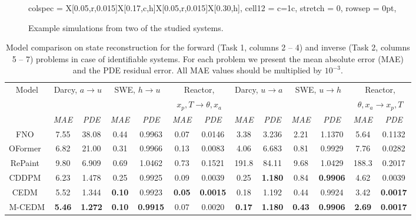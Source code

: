 \documentclass{article}
\newcommand{\xa}{x_a}
\newcommand{\xp}{x_p}
\begin{document}
\begin{figure}[t]
\begin{tblr}{
  colspec = {X[0.05,r,0.015]X[0.17,c,h]X[0.05,r,0.015]X[0.30,h]},
  cell{1}{2} = {c=1}{c}, %
  stretch = 0,
  rowsep = 0pt,
}
\end{tblr}
\vskip -2mm
\caption{Example simulations from two of the studied systems.
}
\label{f:systems}
\end{figure}



\begin{table}[t]
\caption{
Model comparison on state reconstruction for the forward (Task 1, columns 2 -- 4) and inverse (Task 2, columns 5 -- 7) problems in case of identifiable systems. For each problem we present the mean absolute error (MAE) and the PDE residual error. All MAE values should be multiplied by $10^{-3}$.
}
\label{tab:res_state1}
\begin{center}
\begin{tabular}{@{}c|cc|cc|cc||cc|cc|cc}
\multirow{3}{*}{Model}   & \multicolumn{2}{c|}{\multirow{2}{*}{Darcy, $a \rightarrow u$}} & \multicolumn{2}{c|}{\multirow{2}{*}{SWE, $h \rightarrow u$}} & \multicolumn{2}{c||}{Reactor,} & \multicolumn{2}{c|}{\multirow{2}{*}{Darcy, $u \rightarrow a$}} & \multicolumn{2}{c|}{\multirow{2}{*}{SWE, $u \rightarrow h$}} & \multicolumn{2}{c}{Reactor,}
\\
& & & & & \multicolumn{2}{c||}{$\xp, T \rightarrow \theta, \xa$} & & & & & \multicolumn{2}{c}{$\theta, \xa \rightarrow \xp, T$}
\\
\cline{2-13}
                         & \textit{MAE} & \textit{PDE} & \textit{MAE} & \textit{PDE} & \textit{MAE} & \textit{PDE} & \textit{MAE}  & \textit{PDE} & \textit{MAE} & \textit{PDE} & \textit{MAE} & \textit{PDE}
\\
\hline
FNO~\cite{li2021fourier}                     & 7.55 & 38.08 & 0.44 & 0.9963 & 0.07 & 0.0146 & 3.38 & 3.236 & 2.21 & 1.1370 & 5.64 & 0.1132 \\
OFormer~\cite{li2023transformer}             & 6.82 & 21.00 & 0.31 & 0.9966 & 0.13 & 0.0083 & 4.06 & 6.683 & 0.81 & 0.9929 & 7.76 & 0.0282 \\
RePaint~\cite{lugmayr2022repaint}            & 9.80 & 6.909 & 0.69 & 1.0462 & 0.73 & 0.1521 & 191.8 & 84.11 & 9.68 & 1.0429 & 188.3 & 0.2017 \\
CDDPM~\cite{ho2020denoising}                 & 6.23 & 1.478 & 0.25 & 0.9925 & 0.09 & 0.0039 & 0.25 & \textbf{1.180} & 0.84 & \textbf{0.9906} & 4.62 & 0.0039 \\
CEDM~\cite{karras2022elucidating}            & 5.52 & 1.344 & \textbf{0.10} & 0.9923 & \textbf{0.05} & \textbf{0.0015} & 0.18 & 1.192 & 0.44 & 0.9924 & 3.42 & \textbf{0.0017} \\
\hline
M-CEDM              & \textbf{5.46} & \textbf{1.272} & \textbf{0.10} & \textbf{0.9915} & 0.07 & 0.0020 & \textbf{0.17} & \textbf{1.180} & \textbf{0.43} & \textbf{0.9906} & \textbf{2.69} & \textbf{0.0017} \\
\end{tabular}
\end{center}
\end{table}
\end{document}

